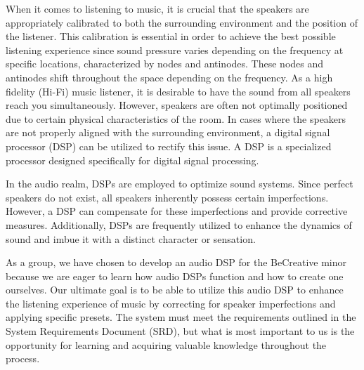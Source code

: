 When it comes to listening to music, it is crucial that the speakers are appropriately calibrated to both the surrounding environment and the position of the listener. This calibration is essential in order to achieve the best possible listening experience since sound pressure varies depending on the frequency at specific locations, characterized by nodes and antinodes. These nodes and antinodes shift throughout the space depending on the frequency. As a high fidelity (Hi-Fi) music listener, it is desirable to have the sound from all speakers reach you simultaneously. However, speakers are often not optimally positioned due to certain physical characteristics of the room. In cases where the speakers are not properly aligned with the surrounding environment, a digital signal processor (DSP) can be utilized to rectify this issue. A DSP is a specialized processor designed specifically for digital signal processing.

\noindent In the audio realm, DSPs are employed to optimize sound systems. Since perfect speakers do not exist, all speakers inherently possess certain imperfections. However, a DSP can compensate for these imperfections and provide corrective measures. Additionally, DSPs are frequently utilized to enhance the dynamics of sound and imbue it with a distinct character or sensation.

\noindent As a group, we have chosen to develop an audio DSP for the BeCreative minor because we are eager to learn how audio DSPs function and how to create one ourselves. Our ultimate goal is to be able to utilize this audio DSP to enhance the listening experience of music by correcting for speaker imperfections and applying specific presets. The system must meet the requirements outlined in the System Requirements Document (SRD), but what is most important to us is the opportunity for learning and acquiring valuable knowledge throughout the process.